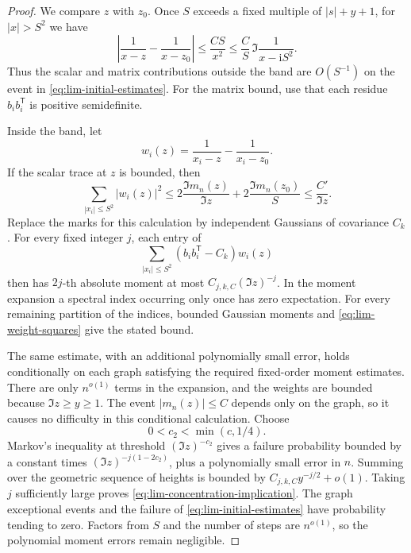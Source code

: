 \begin{proof}
We compare \(z\) with \(z_0\). Once \(S\) exceeds a fixed multiple of
\(|s|+y+1\), for \(|x|>S^2\) we have
\begin{equation}\label{eq:lim-band-tail}
 \left|\frac1{x-z}-\frac1{x-z_0}\right|
 \le \frac{C S}{x^2}
 \le \frac C S\,\Im\frac1{x-\mathrm i S^2}.
\end{equation}
Thus the scalar and matrix contributions outside the band are
\(O(S^{-1})\) on the event in \eqref{eq:lim-initial-estimates}. For the
matrix bound, use that each residue \(b_i b_i^{\mathsf T}\) is positive
semidefinite.

Inside the band, let
\[
 w_i(z)=\frac1{x_i-z}-\frac1{x_i-z_0}.
\]
If the scalar trace at \(z\) is bounded, then
\begin{equation}\label{eq:lim-weight-squares}
 \sum_{|x_i|\le S^2}|w_i(z)|^2
 \le
 2\frac{\Im m_n(z)}{\Im z}
 +2\frac{\Im m_n(z_0)}S
 \le \frac{C'}{\Im z}.
\end{equation}
Replace the marks for this calculation by independent Gaussians of
covariance \(C_k\). For every fixed integer \(j\), each entry of
\[
 \sum_{|x_i|\le S^2}
 (b_i b_i^{\mathsf T}-C_k)w_i(z)
\]
then has \(2j\)-th absolute moment at most
\(C_{j,k,C}(\Im z)^{-j}\). In the moment expansion a spectral index
occurring only once has zero expectation. For every remaining
partition of the indices, bounded Gaussian moments and
\eqref{eq:lim-weight-squares} give the stated bound.

The same estimate, with an additional polynomially small error, holds
conditionally on each graph satisfying the required fixed-order moment
estimates. There are only \(n^{o(1)}\) terms in the expansion, and the
weights are bounded because \(\Im z\ge y\ge1\). The event
\(|m_n(z)|\le C\) depends only on the graph, so it causes no difficulty
in this conditional calculation. Choose
\[
 0<c_2<\min(c,1/4).
\]
Markov's inequality at threshold \((\Im z)^{-c_2}\) gives a failure
probability bounded by a constant times
\((\Im z)^{-j(1-2c_2)}\), plus a polynomially small error in \(n\).
Summing over the geometric sequence of heights is bounded by
\(C_{j,k,C}y^{-j/2}+o(1)\). Taking \(j\) sufficiently large proves
\eqref{eq:lim-concentration-implication}. The graph exceptional events
and the failure of \eqref{eq:lim-initial-estimates} have probability
tending to zero. Factors from \(S\) and the number of steps are
\(n^{o(1)}\), so the polynomial moment errors remain negligible.


\end{proof}
